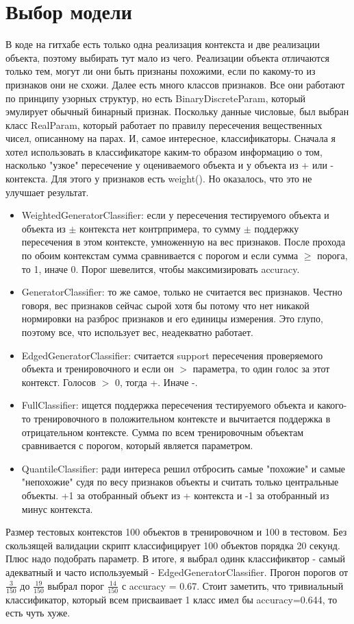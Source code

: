 \documentclass{article}
\begin{document}
\section{Выбор модели}
    В коде на гитхабе есть только одна реализация контекста и две реализации объекта, поэтому выбирать тут мало из чего. Реализации объекта отличаются только тем, могут ли они быть признаны похожими, если по какому-то из признаков они не схожи.
    Далее есть много классов признаков. Все они работают по принципу узорных структур, но есть BinaryDiscreteParam, который эмулирует обычный бинарный признак. Поскольку данные числовые, был выбран класс RealParam, который работает по правилу пересечения вещественных чисел, описанному на парах.
    И, самое интересное, классификаторы. Сначала я хотел использовать в классификаторе каким-то образом информацию о том, насколько "узкое" пересечение у оцениваемого объекта и у объекта из + или - контекста. Для этого у признаков есть weight(). Но оказалось, что это не улучшает результат.
\begin{itemize}
    \item WeightedGeneratorClassifier: если у пересечения тестируемого объекта и объекта из $ \pm $  контекста нет контрпримера, то сумму $ \pm $ поддержку пересечения в этом контексте, умноженную на вес признаков. После прохода по обоим контекстам сумма сравнивается с порогом и если сумма $ \geq $ порога, то 1, иначе 0. Порог шевелится, чтобы максимизировать accuracy.
    \item GeneratorClassifier: то же самое, только не считается вес признаков. Честно говоря, вес признаков сейчас сырой хотя бы потому что нет никакой нормировки на разброс признаков и его единицы измерения. Это глупо, поэтому все, что использует вес, неадекватно работает.
    \item EdgedGeneratorClassifier: считается support пересечения проверяемого объекта и тренировочного и если он $ > $ параметра, то один голос за этот контекст. Голосов $ > $ 0, тогда +. Иначе -.
    \item FullClassifier: ищется поддержка пересечения тестируемого объекта и какого-то тренировочного в положительном контексте и вычитается поддержка в отрицательном контексте. Сумма по всем тренировочным объектам сравнивается с порогом, который является параметром.
    \item QuantileClassifier: ради интереса решил отбросить самые "похожие" и самые "непохожие" судя по весу признаков объекты и считать только центральные объекты. +1 за отобранный объект из + контекста и -1 за отобранный из минус контекста.
\end{itemize}
Размер тестовых контекстов 100 объектов в тренировочном и 100 в тестовом. Без скользящей валидации скрипт классифицирует 100 объектов порядка 20 секунд. Плюс надо подобрать параметр. В итоге, я выбрал одинк классификвтор - самый адекватный и часто используемый - EdgedGeneratorClassifier. Прогон порогов от $ \frac{3}{150} $ до $ \frac{19}{150} $ выбрал порог $ \frac{14}{150} $ с accuracy = 0.67. Стоит заметить, что тривиальный классификатор, который всем присваивает 1 класс имел бы accuracy=0.644, то есть чуть хуже.
\end{document}
